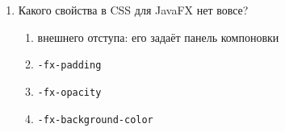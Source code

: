 \begin{enumerate}
\item Какого свойства в CSS для JavaFX нет вовсе?
  \begin{enumerate}
    \item[а)] внешнего отступа: его задаёт панель компоновки
    \item[б)] \texttt{-fx-padding}
    \item[в)] \texttt{-fx-opacity}
    \item[г)] \texttt{-fx-background-color}
  \end{enumerate}

\end{enumerate}
